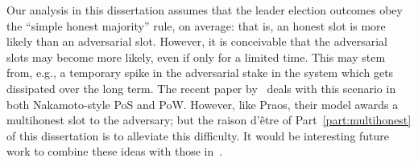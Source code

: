 Our analysis in this dissertation assumes that the leader election outcomes obey 
the ``simple honest majority'' rule, on average: 
that is, an honest slot is more likely than an adversarial slot. 
However, it is conceivable that the adversarial slots may become more likely, even if only for a limited time. 
This may stem from, e.g., a temporary spike in the adversarial stake in the system 
which gets dissipated over the long term. 
The recent paper by~\citet{AdversarialSupremacy} deals with this scenario in both Nakamoto-style PoS and PoW. 
However, like Praos, their model awards a multihonest slot to the adversary; 
but the raison d'\^{e}tre of Part~\ref{part:multihonest} of this dissertation 
is to alleviate this difficulty.
It would be interesting future work to combine these ideas with those in~\cite{AdversarialSupremacy}.







